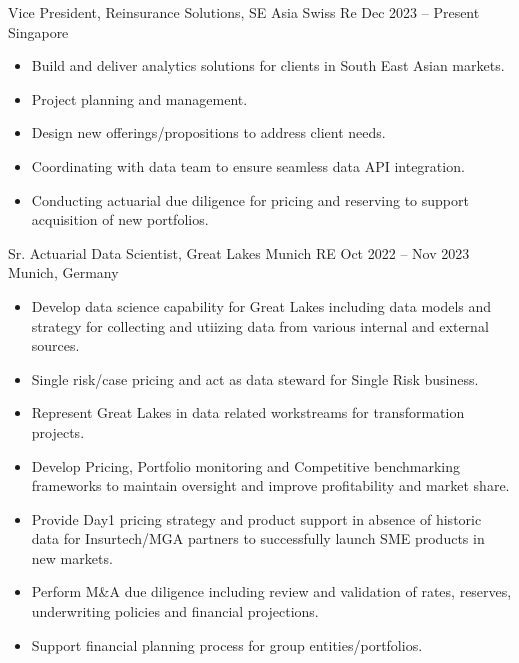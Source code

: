 \documentclass[a4paper,]{fortysecondscv}
\begin{document}
\begin{cvtable}%

    \vspace{\topsep}
    \cvitemoneblock
    {Vice President, Reinsurance Solutions, SE Asia}
    {Swiss Re}
    {Dec 2023 -- Present}
    {Singapore}
    {
        \vspace{\topsep}
        \begin{itemize}[nosep, leftmargin=12pt , label={-}] %
            \item Build and deliver analytics solutions for clients in South East Asian markets.
            \item Project planning and management.
            \item Design new offerings/propositions to address client needs.
            \item Coordinating with data team to ensure seamless data API integration.
            \item Conducting actuarial due diligence for pricing and reserving to support acquisition of new portfolios.
        \end{itemize}
    }

    \vspace{\topsep}
    \cvitemoneblock
    {Sr. Actuarial Data Scientist, Great Lakes}
    {Munich RE}
    {Oct 2022 -- Nov 2023}
    {Munich, Germany}
    {
        \begin{itemize}[nosep, leftmargin=12pt, label={-}] %
            \item Develop data science capability for Great Lakes including data models and strategy for collecting and utiizing data from various internal and external sources.
            \item Single risk/case pricing and act as data steward for Single Risk business.
            \item Represent Great Lakes in data related workstreams for transformation projects.
            \item Develop Pricing, Portfolio monitoring and Competitive benchmarking frameworks to maintain oversight and improve profitability and market share.
            \item Provide Day1 pricing strategy and product support in absence of historic data for Insurtech\//MGA partners to successfully launch SME products in new markets.
            \item Perform M\&A due diligence including review and validation of rates, reserves, underwriting policies and financial projections.
            \item Support financial planning process for group entities/portfolios.
        \end{itemize}
    }


\end{cvtable}
\end{document}
